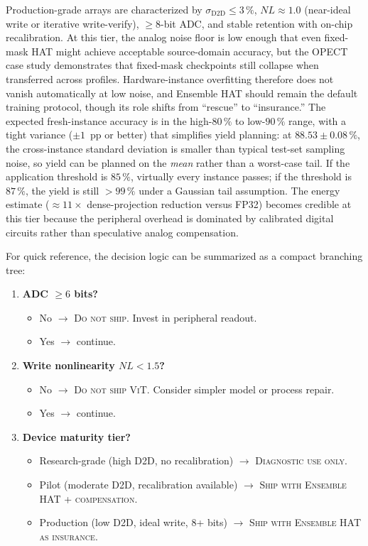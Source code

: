 Production-grade arrays are characterized by $\sigma_{\mathrm{D2D}} \le 3\,\%$, $NL \approx 1.0$ (near-ideal write or iterative write-verify), $\ge 8$-bit ADC, and stable retention with on-chip recalibration.  At this tier, the analog noise floor is low enough that even fixed-mask HAT might achieve acceptable source-domain accuracy, but the OPECT case study demonstrates that fixed-mask checkpoints still collapse when transferred across profiles.  Hardware-instance overfitting therefore does not vanish automatically at low noise, and Ensemble HAT should remain the default training protocol, though its role shifts from ``rescue'' to ``insurance.''  The expected fresh-instance accuracy is in the high-$80\,\%$ to low-$90\,\%$ range, with a tight variance ($\pm 1$~pp or better) that simplifies yield planning: at $88.53\pm0.08\,\%$, the cross-instance standard deviation is smaller than typical test-set sampling noise, so yield can be planned on the \emph{mean} rather than a worst-case tail.  If the application threshold is $85\,\%$, virtually every instance passes; if the threshold is $87\,\%$, the yield is still $>99\,\%$ under a Gaussian tail assumption.  The energy estimate ($\approx 11\times$ dense-projection reduction versus FP32) becomes credible at this tier because the peripheral overhead is dominated by calibrated digital circuits rather than speculative analog compensation.

For quick reference, the decision logic can be summarized as a compact branching tree:
\begin{enumerate}
    \item \textbf{ADC $\ge 6$ bits?}
    \begin{itemize}
        \item No $\rightarrow$ \textsc{Do not ship.} Invest in peripheral readout.
        \item Yes $\rightarrow$ continue.
    \end{itemize}
    \item \textbf{Write nonlinearity $NL < 1.5$?}
    \begin{itemize}
        \item No $\rightarrow$ \textsc{Do not ship ViT.} Consider simpler model or process repair.
        \item Yes $\rightarrow$ continue.
    \end{itemize}
    \item \textbf{Device maturity tier?}
    \begin{itemize}
        \item Research-grade (high D2D, no recalibration) $\rightarrow$ \textsc{Diagnostic use only.}
        \item Pilot (moderate D2D, recalibration available) $\rightarrow$ \textsc{Ship with Ensemble HAT + compensation.}
        \item Production (low D2D, ideal write, 8+ bits) $\rightarrow$ \textsc{Ship with Ensemble HAT as insurance.}
    \end{itemize}
\end{enumerate}


